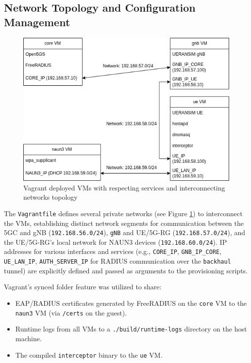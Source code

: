 \subsection{Network Topology and Configuration Management}

\begin{figure}
    \centering
    \includegraphics[width=0.75\linewidth]{figs/topology_vagrant_machine_topology.png}
    \caption{Vagrant deployed \acs{VM}s with respecting services and interconnecting networks topology}
    \label{fig:topology_vagrant_machine_topology}
\end{figure}

The \texttt{Vagrantfile} defines several private networks (see Figure \ref{fig:topology_vagrant_machine_topology}) to interconnect the \acp{VM}, establishing distinct network segments for communication between the \ac{5GC} and \ac{gNB} (\texttt{192.168.56.0/24}), \texttt{gNB} and \ac{UE}/\ac{5G-RG} (\texttt{192.168.57.0/24}), and the \ac{UE}/\ac{5G-RG}'s local network for \ac{NAUN3} devices (\texttt{192.168.60.0/24}). \ac{IP} addresses for various interfaces and services (e.g., \texttt{CORE\_IP}, \texttt{GNB\_IP\_CORE}, \texttt{UE\_LAN\_IP}, \texttt{AUTH\_SERVER\_IP} for \ac{RADIUS} communication over the \texttt{backhaul} tunnel) are explicitly defined and passed as arguments to the provisioning scripts.

Vagrant's synced folder feature was utilized to share:

\begin{itemize}
    \item \ac{EAP}/\ac{RADIUS} certificates generated by FreeRADIUS on the \texttt{core} \ac{VM} to the \texttt{naun3} \ac{VM} (via \texttt{/certs} on the guest).

    \item Runtime logs from all \acp{VM} to a \texttt{./build/runtime-logs} directory on the host machine.

    \item The compiled \texttt{interceptor} binary to the \texttt{ue} \ac{VM}.
\end{itemize}

